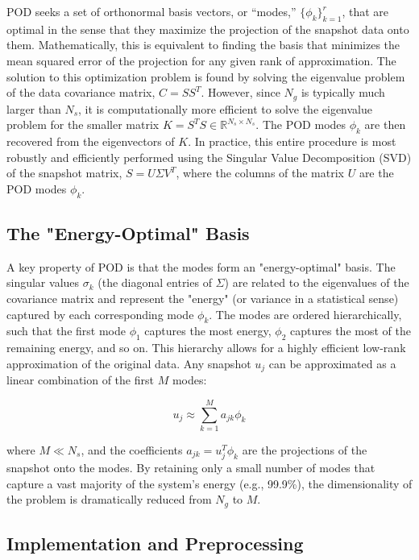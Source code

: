\documentclass[dsc, EN]{ufabcFHZh}
\begin{document}
{POD seeks a set of orthonormal basis vectors, or ``modes,'' $\{\phi_k\}_{k=1}^r$, that are optimal in the sense that they maximize the projection of the snapshot data onto them. Mathematically, this is equivalent to finding the basis that minimizes the mean squared error of the projection for any given rank of approximation. The solution to this optimization problem is found by solving the eigenvalue problem of the data covariance matrix, $C=SS^T$. However, since $N_g$ is typically much larger than $N_s$, it is computationally more efficient to solve the eigenvalue problem for the smaller matrix $K=S^TS \in \mathbb{R}^{N_s \times N_s}$. The POD modes $\phi_k$ are then recovered from the eigenvectors of $K$. In practice, this entire procedure is most robustly and efficiently performed using the Singular Value Decomposition (SVD) of the snapshot matrix, $S=U\Sigma V^T$, where the columns of the matrix $U$ are the POD modes $\phi_k$.

\subsection{The "Energy-Optimal" Basis}

A key property of POD is that the modes form an "energy-optimal" basis. The singular values $\sigma_k$ (the diagonal entries of $\Sigma$) are related to the eigenvalues of the covariance matrix and represent the "energy" (or variance in a statistical sense) captured by each corresponding mode $\phi_k$. The modes are ordered hierarchically, such that the first mode $\phi_1$ captures the most energy, $\phi_2$ captures the most of the remaining energy, and so on. This hierarchy allows for a highly efficient low-rank approximation of the original data. Any snapshot $u_j$ can be approximated as a linear combination of the first $M$ modes:

$$u_j \approx \sum_{k=1}^{M} a_{jk} \phi_k$$

where $M \ll N_s$, and the coefficients $a_{jk} = u_j^T \phi_k$ are the projections of the snapshot onto the modes. By retaining only a small number of modes that capture a vast majority of the system's energy (e.g., 99.9\%), the dimensionality of the problem is dramatically reduced from $N_g$ to $M$.

\subsection{Implementation and Preprocessing}

}
\end{document}
